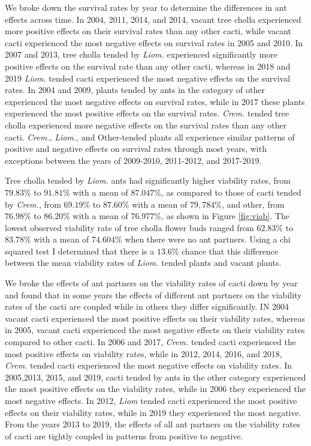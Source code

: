 \documentclass[12pt,a4paper]{article}
\begin{document}
		We broke down the survival rates by year to determine the differences in ant effects across time. 
		In 2004, 2011, 2014, and 2014, vacant tree cholla experienced more positive effects on their survival rates than any other cacti, while vacant cacti experienced the most negative effects on survival rates in 2005 and 2010.
		In 2007 and 2013, tree cholla tended by \textit{Liom.} experienced significantly more positive effects on the survival rate than any other cacti, whereas in 2018 and 2019 \textit{Liom.} tended cacti experienced the most negative effects on the survival rates. 
		In 2004 and 2009, plants tended by ants in the category of other experienced the most negative effects on survival rates, while in 2017 these plants experienced the most positive effects on the survival rates. 
		\textit{Crem.} tended tree cholla experienced more negative effects on the survival rates than any other cacti. 
		\textit{Crem.}, \textit{Liom.}, and Other-tended plants all experience similar patterns of positive and negative effects on survival rates through most years, with exceptions between the years of 2009-2010, 2011-2012, and 2017-2019. 
		
		Tree cholla tended by \textit{Liom.} ants had significantly higher viability rates, from $79.83\%$ to $91.81\%$ with a mean of $87.047\%$, as compared to those of cacti tended by \textit{Crem.}, from $69.19\%$ to $87.60\%$ with a mean of $79,784\%$, and other, from $76.98\%$ to $86.20\%$ with a mean of $76.977\%$, as shown in Figure \ref{fig:viab}. 
		The lowest observed viability rate of tree cholla flower buds ranged from $62.83\%$ to $83.78\%$ with a mean of $74.604\%$ when there were no ant partners. 
		Using a chi squared test I determined that there is a $13.6\%$ chance that this difference between the mean viability rates of \textit{Liom.} tended plants and vacant plants. 
		
		We broke the effects of ant partners on the viability rates of cacti down by year and found that in some years the effects of different ant partners on the viability rates of the cacti are coupled while in others they differ significantly. 
		IN 2004 vacant cacti experienced the most positive effects on their viability rates, whereas in 2005, vacant cacti experienced the most negative effects on their viability rates compared to other cacti. 
		In 2006 and 2017, \textit{Crem.} tended cacti experienced the most positive effects on viability rates, while in 2012, 2014, 2016, and 2018, \textit{Crem.} tended cacti experienced the most negative effects on viability rates. 
		In 2005,2013, 2015, and 2019, cacti tended by ants in the other category experienced the most positive effects on the viability rates, while in 2006 they experienced the most negative effects. 
		In 2012, \textit{Liom} tended cacti experienced the most positive effects on their viability rates, while in 2019 they experienced the most negative. 
		From the years 2013 to 2019, the effects of all ant partners on the viability rates of cacti are tightly coupled in patterns from positive to negative. 
		
\end{document}
